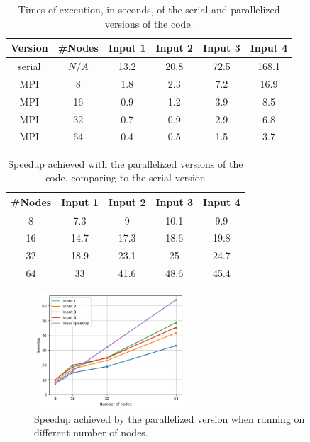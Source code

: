 \documentclass{article}
\begin{document}
\begin{table}[h!]
	\centering
	\begin{tabular}{||c c c c c c||} 
	 \hline
	 Version & \#Nodes & Input 1 & Input 2 & Input 3 & Input 4\\ [0.5ex] 
	 \hline\hline
	 serial & $N/A$ & 13.2 & 20.8 & 72.5 & 168.1 \\ 
	 MPI & 8 & 1.8 & 2.3 & 7.2 & 16.9 \\ 
	 MPI & 16 & 0.9 & 1.2 & 3.9 & 8.5  \\
	 MPI & 32 & 0.7 & 0.9 & 2.9 & 6.8 \\
	 MPI & 64 & 0.4 & 0.5 & 1.5 & 3.7 \\ [1ex] 
	 \hline
	\end{tabular}
	\caption{Times of execution, in seconds, of the serial and parallelized versions of the code.}
	\label{execution-times}
\end{table}

\begin{table}[h!]
	\centering
	\begin{tabular}{||c c c c c||} 
	 \hline
	 \#Nodes & Input 1 & Input 2 & Input 3 & Input 4\\ [0.5ex] 
	 \hline\hline
	 8 & 7.3 & 9 & 10.1 & 9.9 \\ 
	 16 & 14.7 & 17.3 & 18.6 & 19.8  \\
	 32 & 18.9 & 23.1 & 25 & 24.7 \\
	 64 & 33 & 41.6 & 48.6 & 45.4 \\ [1ex] 
	 \hline
	\end{tabular}
	\caption{Speedup achieved with the parallelized versions of the code, comparing to the serial version}
	\label{speedup}
\end{table}

\begin{figure}[htbp]
    \centering
    \includegraphics[width=0.5\textwidth]{img/speedup.png}
    \caption{Speedup achieved by the parallelized version when running on different number of nodes.}
    \label{speedup-graph}
\end{figure}
\end{document}
